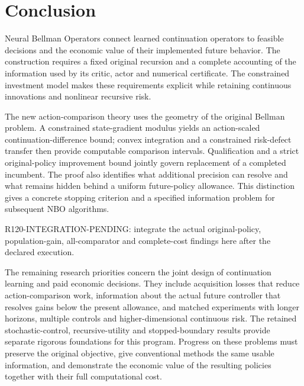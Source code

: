 \section{Conclusion}\label{sec:conclusion120}
Neural Bellman Operators connect learned continuation operators to feasible
decisions and the economic value of their implemented future behavior. The
construction requires a fixed original recursion and a complete accounting of
the information used by its critic, actor and numerical certificate. The
constrained investment model makes these requirements explicit while retaining
continuous innovations and nonlinear recursive risk.

The new action-comparison theory uses the geometry of the original Bellman
problem. A constrained state-gradient modulus yields an action-scaled
continuation-difference bound; convex integration and a constrained risk-defect
transfer then provide computable comparison intervals. Qualification and a
strict original-policy improvement bound jointly govern replacement of a
completed incumbent. The proof also identifies what additional precision can
resolve and what remains hidden behind a uniform future-policy allowance. This
distinction gives a concrete stopping criterion and a specified information
problem for subsequent NBO algorithms.

R120-INTEGRATION-PENDING: integrate the actual original-policy, population-gain,
all-comparator and complete-cost findings here after the declared execution.

The remaining research priorities concern the joint design of continuation
learning and paid economic decisions. They include acquisition losses that
reduce action-comparison work, information about the actual future controller
that resolves gains below the present allowance, and matched experiments with
longer horizons, multiple controls and higher-dimensional continuous risk.
The retained stochastic-control, recursive-utility and stopped-boundary results
provide separate rigorous foundations for this program. Progress on these
problems must preserve the original objective, give conventional methods the
same usable information, and demonstrate the economic value of the resulting
policies together with their full computational cost.
